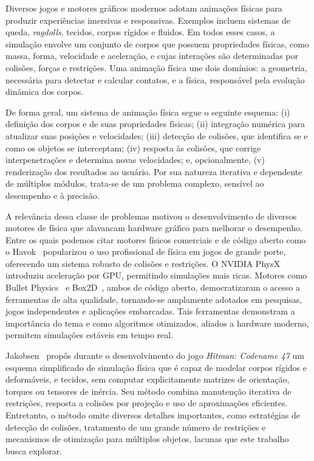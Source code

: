 Diversos jogos e motores gráficos modernos adotam animações físicas para produzir experiências imersivas e responsivas. Exemplos incluem sistemas de queda, \textit{ragdolls}, tecidos, corpos rígidos e fluidos. Em todos esses casos, a simulação envolve um conjunto de corpos que possuem propriedades físicas, como massa, forma, velocidade e aceleração, e cujas interações são determinadas por colisões, forças e restrições. Uma animação física une dois domínios: a geometria, necessária para detectar e calcular contatos, e a física, responsável pela evolução dinâmica dos corpos.

De forma geral, um sistema de animação física segue o seguinte esquema: (i) definição dos corpos e de suas propriedades físicas; (ii) integração numérica para atualizar suas posições e velocidades; (iii) detecção de colisões, que identifica se e como os objetos se interceptam; (iv) resposta às colisões, que corrige interpenetrações e determina novas velocidades; e, opcionalmente, (v) renderização dos resultados ao usuário. Por sua natureza iterativa e dependente de múltiplos módulos, trata-se de um problema complexo, sensível ao desempenho e à precisão.

A relevância dessa classe de problemas motivou o desenvolvimento de diversos motores de física que alavancam hardware gráfico para melhorar o desempenho. Entre os quais podemos citar motores físicos comerciais e de código aberto como o Havok~\cite{havok_physics} popularizou o uso profissional de física em jogos de grande porte, oferecendo um sistema robusto de colisões e restrições. O NVIDIA PhysX~\cite{physx} introduziu aceleração por GPU, permitindo simulações mais ricas. Motores como Bullet Physics~\cite{bullet_physics} e Box2D~\cite{box2d_physics}, ambos de código aberto, democratizaram o acesso a ferramentas de alta qualidade, tornando-se amplamente adotados em pesquisas, jogos independentes e aplicações embarcadas. Tais ferramentas demonstram a importância do tema e como algoritmos otimizados, aliados a hardware moderno, permitem simulações estáveis em tempo real.

Jakobsen~\cite{jakobsen2001advanced} propôs durante o desenvolvimento do jogo \textit{Hitman: Codename 47} um esquema simplificado de simulação física que é capaz de modelar corpos rígidos e deformáveis, e tecidos, sem computar explicitamente matrizes de orientação, torques ou tensores de inércia. Seu método combina manutenção iterativa de restrições, resposta a colisões por projeção e uso de aproximações eficientes. Entretanto, o método omite diversos detalhes importantes, como estratégias de detecção de colisões, tratamento de um grande número de restrições e mecanismos de otimização para múltiplos objetos, lacunas que este trabalho busca explorar.

